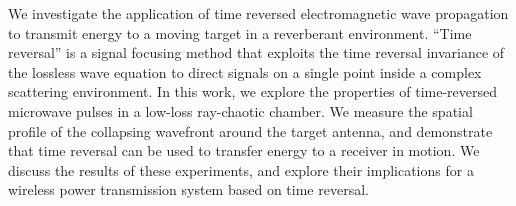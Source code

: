 We investigate the application of time reversed electromagnetic wave propagation
to transmit energy to a moving target in a reverberant environment.
%
``Time reversal'' is a signal focusing method that exploits the time reversal
invariance of the lossless wave equation to direct signals on a single point
inside a complex scattering environment.
%
In this work, we explore the properties of time-reversed microwave pulses in a
low-loss ray-chaotic chamber.
%
We measure the spatial profile of the collapsing wavefront around the target
antenna, and demonstrate that time reversal can be used to transfer energy to a
receiver in motion.
%
We discuss the results of these experiments, and explore their implications for
a wireless power transmission system based on time reversal.
